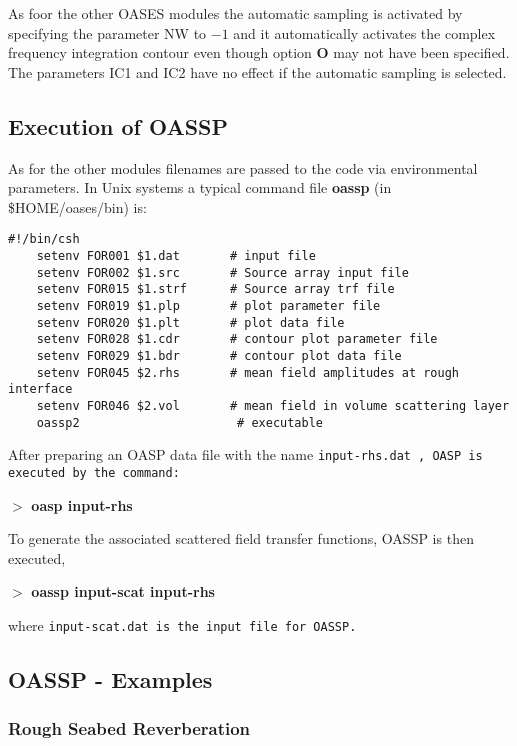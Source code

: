 As foor the other OASES modules the  automatic sampling  is  activated  by 
specifying the parameter NW to $ -1$ and it automatically  activates 
the  complex frequency integration contour even though option  {\bf O} 
may  not have been specified. The parameters IC1 and IC2 have  no 
effect if the automatic sampling is selected.
 
\subsection{Execution of OASSP}

    As  for  the other modules  filenames  are  passed  to  the  code   via 
environmental parameters. In Unix systems a typical command  file 
{\bf oassp} (in  \$HOME/oases/bin) is:

\small
\begin{verbatim}
#!/bin/csh
    setenv FOR001 $1.dat       # input file 
    setenv FOR002 $1.src       # Source array input file
    setenv FOR015 $1.strf      # Source array trf file
    setenv FOR019 $1.plp       # plot parameter file
    setenv FOR020 $1.plt       # plot data file  
    setenv FOR028 $1.cdr       # contour plot parameter file 
    setenv FOR029 $1.bdr       # contour plot data file 
    setenv FOR045 $2.rhs       # mean field amplitudes at rough interface
    setenv FOR046 $2.vol       # mean field in volume scattering layer
    oassp2                      # executable
\end{verbatim}
\normalsize

    After preparing an OASP  data file with the name \tt input-rhs.dat
\rm, OASP  is 
executed by the command:

    $>$ {\bf oasp input-rhs}

To generate the associated scattered field transfer functions, OASSP
    is then executed,

    $>$ {\bf oassp input-scat input-rhs}

where \tt input-scat.dat \rm is the input file for OASSP. 

\newpage
\subsection{OASSP - Examples}

\subsubsection{Rough Seabed Reverberation}

